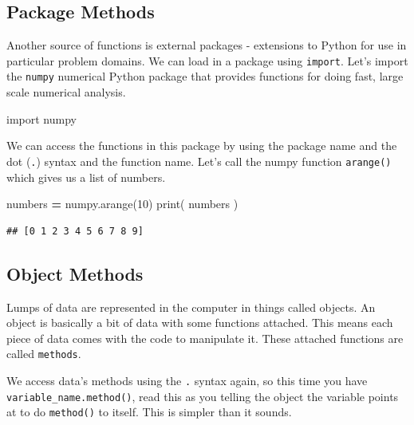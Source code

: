 \documentclass[]{book}
\newenvironment{Shaded}{\begin{snugshade}}{\end{snugshade}}
\newcommand{\BuiltInTok}[1]{#1}
\newcommand{\DecValTok}[1]{\textcolor[rgb]{0.00,0.00,0.81}{#1}}
\newcommand{\ImportTok}[1]{#1}
\newcommand{\NormalTok}[1]{#1}
\newcommand{\OperatorTok}[1]{\textcolor[rgb]{0.81,0.36,0.00}{\textbf{#1}}}
\theoremstyle{definition}
\theoremstyle{definition}
\theoremstyle{definition}
\theoremstyle{remark}
\begin{document}
\hypertarget{package-methods}{%
\subsection{Package Methods}\label{package-methods}}

Another source of functions is external packages - extensions to Python
for use in particular problem domains. We can load in a package using
\texttt{import}. Let's import the \texttt{numpy} numerical Python
package that provides functions for doing fast, large scale numerical
analysis.

\begin{Shaded}
\begin{Highlighting}[]
\ImportTok{import}\NormalTok{ numpy}
\end{Highlighting}
\end{Shaded}

We can access the functions in this package by using the package name
and the dot (\texttt{.}) syntax and the function name. Let's call the
numpy function \texttt{arange()} which gives us a list of numbers.

\begin{Shaded}
\begin{Highlighting}[]
\NormalTok{numbers }\OperatorTok{=}\NormalTok{ numpy.arange(}\DecValTok{10}\NormalTok{)}
\BuiltInTok{print}\NormalTok{( numbers )}
\end{Highlighting}
\end{Shaded}

\begin{verbatim}
## [0 1 2 3 4 5 6 7 8 9]
\end{verbatim}

\hypertarget{object-methods}{%
\subsection{Object Methods}\label{object-methods}}

Lumps of data are represented in the computer in things called objects.
An object is basically a bit of data with some functions attached. This
means each piece of data comes with the code to manipulate it. These
attached functions are called \texttt{methods}.

We access data's methods using the \texttt{.} syntax again, so this time
you have \texttt{variable\_name.method()}, read this as you telling the
object the variable points at to do \texttt{method()} to itself. This is
simpler than it sounds.
\end{document}
